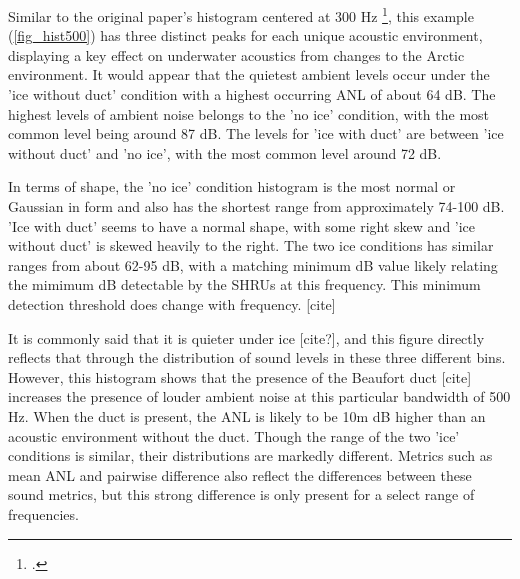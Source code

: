 Similar to the original paper's histogram centered at 300 Hz \footcite[author]{Bonnel2021}, this example (\autoref{fig_hist500}) has three distinct peaks for each unique acoustic environment, displaying a key effect on underwater acoustics from changes to the Arctic environment.  It would appear that the quietest ambient levels occur under the 'ice without duct' condition with a highest occurring ANL of about 64 dB. The highest levels of ambient noise belongs to  the 'no ice' condition, with the most common level being around 87 dB. The levels for 'ice with duct' are between 'ice without duct' and 'no ice', with the most common level around 72 dB. 

In terms of shape, the 'no ice' condition histogram is the most normal or Gaussian in form and also has the shortest range from approximately 74-100 dB. 'Ice with duct' seems to have a normal shape, with some right skew and 'ice without duct' is skewed heavily to the right. The two ice conditions has similar ranges from about 62-95 dB, with a matching minimum dB value likely relating the mimimum dB detectable by the SHRUs at this frequency. This minimum detection threshold does change with frequency. [cite] %

It is commonly said that it is quieter under ice [cite?], and this figure directly reflects that through the distribution of sound levels in these three different bins. However, this histogram shows that the presence of the Beaufort duct [cite] increases the presence of louder ambient noise at this particular bandwidth of 500 Hz. When the duct is present, the ANL is likely to be 10m dB higher than an acoustic environment without the duct. Though the range of the two 'ice' conditions is similar,  their distributions are markedly different. Metrics such as mean ANL and pairwise difference also reflect the differences between these sound metrics, but this strong difference is only present for a select range of frequencies. 


